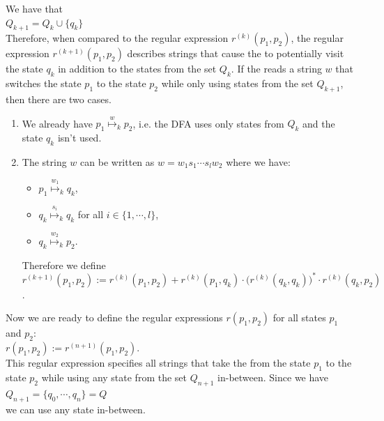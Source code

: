 \begin{enumerate}
  We have that
  \\[0.2cm]
  \hspace*{1.3cm}
  $Q_{k+1} = Q_k \cup \{q_k\}$
  \\[0.2cm]
  Therefore, when compared to the regular expression $r^{(k)}(p_1, p_2)$,
  the regular expression  $r^{(k+1)}(p_1, p_2)$ describes strings that cause the  to potentially
  visit the state  $q_k$ in addition to the states from the set $Q_k$.
  If the  reads a string $w$ that switches the state $p_1$ to the state $p_2$ while only using states
  from the set $Q_{k+1}$, then there are two cases.
  \begin{enumerate}
  \item We already have $p_1 \stackrel{w}{\mapsto}_k p_2$, i.e. the DFA uses only states from $Q_k$ and the
        state $q_{k}$ isn't used.
  \item The string $w$ can be written as  $w = w_1 s_1\cdots s_l w_2$ where we have:
        \begin{itemize}
        \item $p_1 \stackrel{w_1}{\mapsto}_k q_k$,
        \item $q_k \stackrel{s_i}{\mapsto}_k q_k$ \quad for all $i \in \{ 1, \cdots, l\}$,
        \item $q_k \stackrel{w_2}{\mapsto}_k p_2$.
        \end{itemize}
        Therefore we define
        \\[0.2cm]
        \hspace*{1.3cm}
        $r^{(k+1)}(p_1,p_2) := 
         r^{(k)}(p_1,p_2) + 
         r^{(k)}(p_1,q_k) \cdot \bigl(r^{(k)}(q_k,q_k)\bigr)^* \cdot r^{(k)}(q_k,p_2)$.
  \end{enumerate}  
\end{enumerate}
Now we are ready to define the regular expressions $r(p_1,p_2)$ for all states $p_1$ and $p_2$:
\\[0.2cm]
\hspace*{1.3cm}
$r(p_1,p_2) := r^{(n+1)}(p_1,p_2)$. 
\\[0.2cm]
This regular expression specifies all strings that take the  from the state
$p_1$ to the state $p_2$ while using any state from the set 
$Q_{n+1}$ in-between.   Since we have
\\[0.2cm]
\hspace*{1.3cm}
$Q_{n+1} = \bigl\{ q_0, \cdots, q_n \bigr\} = Q$
\\[0.2cm]
we can use any state in-between.

